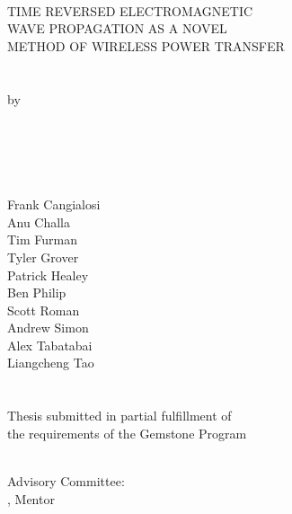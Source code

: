 \hbox{\ }
\vspace{0.5in}
\startSINGLEspacing
\begin{center}

\large{{TIME REVERSED ELECTROMAGNETIC\\
        WAVE PROPAGATION AS A NOVEL \\
        METHOD OF WIRELESS POWER TRANSFER}}\\
\ \\
\ \\
\large{by} \\
\ \\
\large{\teamname}
\ \\
\ \\
\ \\
\ \\
\small\normalsize
Frank Cangialosi\\
Anu Challa\\
Tim Furman\\
Tyler Grover\\
Patrick Healey\\
Ben Philip\\
Scott Roman\\
Andrew Simon\\
Alex Tabatabai\\
Liangcheng Tao\\
\ \\ 
\ \\
Thesis submitted in partial fulfillment of \\ 
the requirements of the Gemstone Program\\
\Umd \\
\the\year
\end{center}

\vspace{7.5em}

\noindent Advisory Committee: \\
\mentor, Mentor \\
\discussantsEACHLINE
